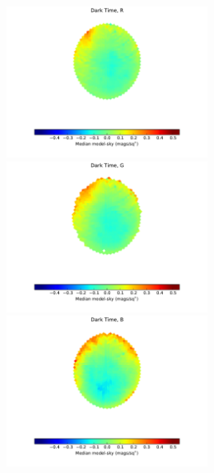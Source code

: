 \documentclass[]{spie}
\begin{document}
\begin{figure}
  \includegraphics[height=5cm]{plots/medianResidMap_R.pdf}\includegraphics[height=5cm]{plots/medianResidMap_G.pdf}\includegraphics[height=5cm]{plots/medianResidMap_B.pdf} \\

\end{figure}
\end{document}
